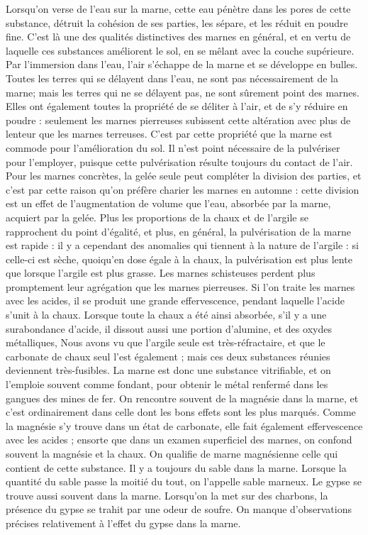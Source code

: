 Lorsqu'on verse de l'eau sur la marne, cette eau pénètre dans les pores de cette substance, détruit la cohésion de ses parties, les sépare, et les réduit en poudre fine. C'est là une des qualités distinctives des marnes en général, et en vertu de laquelle ces substances améliorent le sol, en se mêlant avec la couche supérieure. Par l'immersion dans l'eau, l'air s'échappe de la marne et se développe en bulles. Toutes les terres qui se délayent dans l'eau, ne sont pas nécessairement de la marne; mais les terres qui ne se délayent pas, ne sont sûrement point des marnes. Elles ont également toutes la propriété de se déliter à l'air, et de s'y réduire en poudre : seulement les marnes pierreuses subissent cette altération avec plus de lenteur que les marnes terreuses. C'est par cette propriété que la marne est commode pour l'amélioration du sol. Il n'est point nécessaire de la pulvériser pour l'employer, puisque cette pulvérisation résulte toujours du contact de l'air. Pour les marnes concrètes, la gelée seule peut compléter la division des parties, et c'est par cette\setcounter{page}{50} raison qu'on préfère charier les marnes en automne : cette division est un effet de l'augmentation de volume que l'eau, absorbée par la marne, acquiert par la gelée.
Plus les proportions de la chaux et de l'argile se rapprochent du point d'égalité, et plus, en général, la pulvérisation de la marne est rapide : il y a cependant des anomalies qui tiennent à la nature de l'argile : si celle-ci est sèche, quoiqu'en dose égale à la chaux, la pulvérisation est plus lente que lorsque l'argile est plus grasse.
Les marnes schisteuses perdent plus promptement leur agrégation que les marnes pierreuses.
Si l'on traite les marnes avec les acides, il se produit une grande effervescence, pendant laquelle l'acide s'unit à la chaux. Lorsque toute la chaux a été ainsi absorbée, s'il y a une surabondance d'acide, il dissout aussi une portion d'alumine, et des oxydes métalliques,
Nous avons vu que l'argile seule est très-réfractaire, et que le carbonate de chaux seul l'est également ; mais ces deux substances réunies deviennent très-fusibles. La marne est donc une substance vitrifiable, et on l'emploie souvent comme fondant, pour obtenir le métal renfermé dans les gangues des mines de fer.\setcounter{page}{51} On rencontre souvent de la magnésie dans la marne, et c'est ordinairement dans celle dont les bons effets sont les plus marqués. Comme la magnésie s'y trouve dans un état de carbonate, elle fait également effervescence avec les acides ; ensorte que dans un examen superficiel des marnes, on confond souvent la magnésie et la chaux. On qualifie de marne magnésienne celle qui contient de cette substance. Il y a toujours du sable dans la marne. Lorsque la quantité du sable passe la moitié du tout, on l'appelle sable marneux. Le gypse se trouve aussi souvent dans la marne. Lorsqu'on la met sur des charbons, la présence du gypse se trahit par une odeur de soufre. On manque d'observations précises relativement à l'effet du gypse dans la marne.
